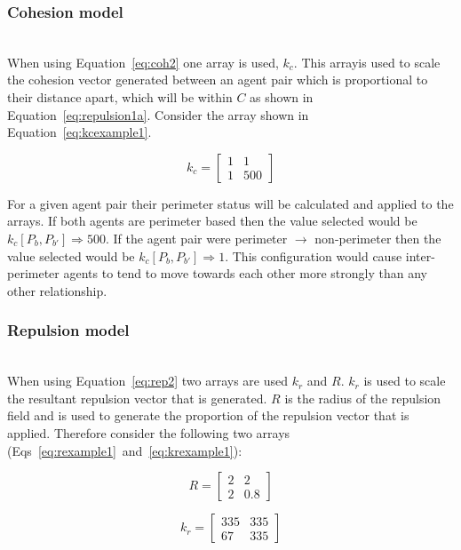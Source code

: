 \documentclass[12pt,a4paper]{IEEEtran}
\newcommand{\kc}{\mathit{k_c}}
\newcommand{\kr}{\mathit{k_r}}
\newcommand{\rb}{\mathit{R}}
\begin{document}
\subsubsection{Cohesion model}~\\
When using Equation~\ref{eq:coh2} one array is used, $k_c$. This arrayis used to scale the cohesion vector generated between an agent pair which is proportional to their distance apart, which will be within $C$ as shown in Equation~\ref{eq:repulsion1a}. Consider the array shown in Equation~\ref{eq:kcexample1}.

\begin{equation}\label{eq:kcexample1}
	\kc = 
	\begin{bmatrix}
	1 & 1\\
	1 & 500
	\end{bmatrix}
\end{equation}

For a given agent pair their perimeter status will be calculated and applied to the arrays. If both agents are perimeter based then the value selected would be $k_c[P_b,P_{b'}]\Rightarrow 500$. If the agent pair were perimeter $\rightarrow$ non-perimeter then the value selected would be $k_c[P_b,P_{b'}]\Rightarrow 1$. This configuration would cause inter-perimeter agents to tend to move towards each other more strongly than any other relationship.

\subsubsection{Repulsion model}~\\
When using Equation~\ref{eq:rep2} two arrays are used $\kr$ and $\rb$. $\kr$ is used to scale the resultant repulsion vector that is generated. $\rb$ is the radius of the repulsion field and is used to generate the proportion of the repulsion vector that is applied. Therefore consider the following two arrays (Eqs~\ref{eq:rexample1}~and~\ref{eq:krexample1}):

\begin{equation}\label{eq:rexample1}
	\rb = 
	\begin{bmatrix}
	2 & 2\\
	2 & 0.8
	\end{bmatrix}
\end{equation}

\begin{equation}\label{eq:krexample1}
	\kr = 
	\begin{bmatrix}
	335 & 335\\
	67 & 335
	\end{bmatrix}
\end{equation}
\end{document}
